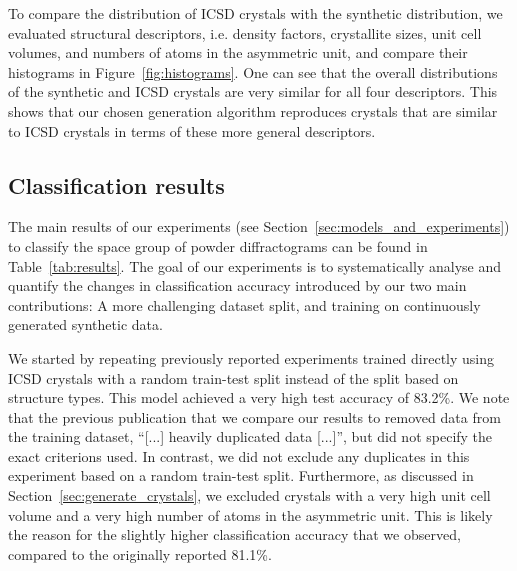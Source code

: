     To compare the distribution of ICSD crystals with the synthetic
    distribution, we evaluated structural descriptors, i.e. density factors, crystallite sizes, unit cell volumes, and numbers of atoms in the asymmetric unit, and compare their histograms
    in Figure~\ref{fig:histograms}.
    One can see that the overall distributions of
    the synthetic and ICSD crystals are very similar for all four descriptors.
    This shows that our chosen generation algorithm reproduces crystals that are
    similar to ICSD crystals in terms of these more general descriptors.

    \subsection{Classification results} \label{sec:classification_results} 
    
    The main results of our experiments (see Section~\ref{sec:models_and_experiments}) to
    classify the space group of powder diffractograms can be
    found in Table~\ref{tab:results}. 
    The goal of our experiments is to systematically analyse and quantify the changes in classification accuracy introduced by our two main contributions: A more challenging dataset split, and training on continuously generated synthetic data.

    We started by repeating previously reported
    experiments\supercite{parkClassificationCrystalStructure2017} trained
    directly using ICSD crystals with a random train-test split instead of the
    split based on structure types. This model achieved a very high test
    accuracy of 83.2\%. We note that the previous publication that we compare
    our results to\supercite{parkClassificationCrystalStructure2017} removed
    data from the training dataset, ``[...] heavily duplicated data
    [...]''\supercite{parkClassificationCrystalStructure2017}, but did not
    specify the exact criterions used. In contrast, we did not exclude any
    duplicates in this experiment based on a random train-test split.
    Furthermore, as discussed in Section~\ref{sec:generate_crystals}, we
    excluded crystals with a very high unit cell volume and a very high number
    of atoms in the asymmetric unit. This is likely the reason for the slightly
    higher classification accuracy that we observed, compared to the originally
    reported 81.1\%. 
    
